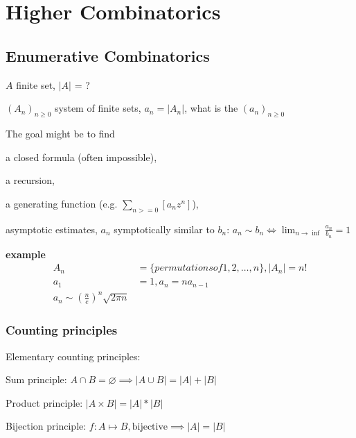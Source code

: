 

\chapter{Higher Combinatorics}

\section{Enumerative Combinatorics}

$A$ finite set, $|A|$ = ?

$(A_n)_{n ≥ 0}$ system of finite sets, $a_n = |A_n|$, what is the  $(a_n)_{n ≥ 0}$

The goal might be to find
\begin{compactitem}
\item a closed formula (often impossible),
\item a recursion,
\item a generating function (e.g. $\sum_{n >= 0}[a_n z^n]$),
\item asymptotic estimates, $a_n$ symptotically similar to $b_n$:
    $a_n \sim b_n \iff \lim_{n \to \inf} \frac{a_n}{b_n} = 1$
\end{compactitem}


\textbf{example}
\begin{align*}
A_n &= \{permutations of 1,2, \ldots, n\}, |A_n| = n! \\
a_1 &= 1, a_n = n a_{n-1} \\
a_n \sim (\frac{n}{e})^n \sqrt{2\pi n}
\end{align*}


\subsection{Counting principles}

Elementary counting principles:
\begin{compactenum}
\item Sum principle:
    $A\cap B = \varnothing \implies |A\cup B| = |A| + |B|$
\item Product principle:
    $|A\times B| = |A| * |B|$
\item Bijection principle:
    $f: A\mapsto B, \text{bijective}\implies |A| = |B|$
\end{compactenum}

